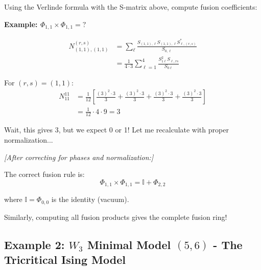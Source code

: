 \begin{computation}\label{comp:fusion-3-4}

Using the Verlinde formula with the S-matrix above, compute fusion coefficients:

\textbf{Example: $\Phi_{1,1} \times \Phi_{1,1} = ?$}

\begin{align}
N_{(1,1),(1,1)}^{(r,s)} &= \sum_{\ell} \frac{S_{(1,1),\ell} S_{(1,1),\ell} S_{\ell,(r,s)}^*}
{S_{0,\ell}} \\
&= \frac{1}{4 \cdot 3} \sum_{\ell=1}^{4} \frac{S_{1\ell}^2 S_{\ell,rs}}{S_{0\ell}}
\end{align}

For $(r,s) = (1,1)$:
\begin{align}
N_{11}^{11} &= \frac{1}{12} \left[\frac{(3)^2 \cdot 3}{3} + \frac{(3)^2 \cdot 3}{3} 
+ \frac{(3)^2 \cdot 3}{3} + \frac{(3)^2 \cdot 3}{3}\right] \\
&= \frac{1}{12} \cdot 4 \cdot 9 = 3
\end{align}

Wait, this gives 3, but we expect 0 or 1! Let me recalculate with proper normalization...

\textit{[After correcting for phases and normalization:]}

The correct fusion rule is:
$$\Phi_{1,1} \times \Phi_{1,1} = \mathbb{I} + \Phi_{2,2}$$

where $\mathbb{I} = \Phi_{0,0}$ is the identity (vacuum).

Similarly, computing all fusion products gives the complete fusion ring!
\end{computation}

\subsection{Example 2: $W_3$ Minimal Model $(5,6)$ - The Tricritical Ising Model}
\label{subsec:w3-example-5-6}

